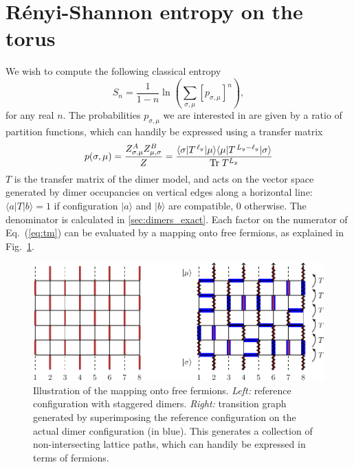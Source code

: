 \documentclass[11pt]{iopart}
\begin{document}
\section{R\'enyi-Shannon entropy on the torus}
\label{sec:lgv}
We wish to compute the following classical entropy
\begin{equation}
 S_n=\frac{1}{1-n} \ln \left(\sum_{\sigma,\mu} [p_{\sigma,\mu}]^n\right), 
\end{equation}
for any real $n$. The probabilities $p_{\sigma,\mu}$ we are interested in are given by a ratio of partition functions, which can handily be expressed using a transfer matrix
\begin{equation}\label{eq:tm}
 p(\sigma,\mu)=\frac{Z_{\sigma.\mu}^A Z_{\mu,\sigma}^B}{Z}=\frac{\langle  \sigma|T^{\,\ell_y}|\mu\rangle\langle \mu|T^{\,L_y-\ell_y}|\sigma\rangle}{{\rm Tr}\; T^{L_y}}
\end{equation}
$T$ is the transfer matrix of the dimer model, and acts on the vector space generated by dimer occupancies on vertical edges along a horizontal line: $\langle a|T|b\rangle=1$ if configuration $|a\rangle$ and $|b\rangle$ are compatible, $0$ otherwise. The denominator is calculated in \ref{sec:dimers_exact}. Each factor on the numerator of Eq.~(\ref{eq:tm}) can be evaluated by a mapping onto free fermions\cite{Lieb1967,Alet_dimers2,Misguich}, as explained in Fig.~\ref{fig:freefermions}.  
\begin{figure}[ht]
\begin{center}
\includegraphics{./figures/free_fermions.pdf}
  \end{center}
  \caption{Illustration of the mapping onto free fermions. \emph{Left:} reference configuration with staggered dimers. \emph{Right:} transition graph generated by superimposing the reference configuration on the actual dimer configuration (in blue). This generates a collection of non-intersecting lattice paths, which can handily be expressed in terms of fermions. }
  \label{fig:freefermions}
  \end{figure}
\end{document}
